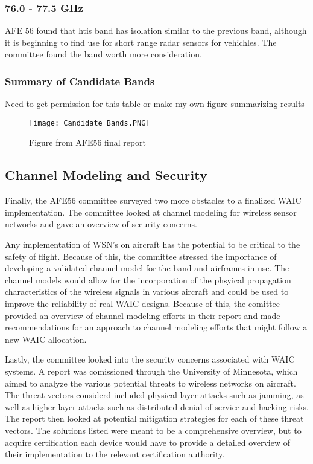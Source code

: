 \subsubsection{76.0 - 77.5 GHz}
 AFE 56 found that htis band has isolation similar to the previous band, although it is beginning to find use for short range radar sensors for vehichles. The committee found the band worth more consideration. 
 
\subsubsection{Summary of Candidate Bands}
 Need to get permission for this table or make my own figure summarizing results
 \begin{figure}
 \centering
 \texttt{[image: Candidate\_Bands.PNG]}
 \caption{Figure from AFE56 final report}
 \label{fig:Candidates}
 \end{figure}
 
\subsection{Channel Modeling and Security}
Finally, the AFE56 committee surveyed two more obstacles to a finalized WAIC implementation. The committee looked at channel modeling for wireless sensor networks and  gave an overview of security concerns. 

Any implementation of WSN's on aircraft has the potential to be critical to the safety of flight. Because of this, the committee stressed the importance of  developing a validated channel model for the band and airframes in use. The channel models would allow for the incorporation of the phsyical propagation characteristics of the wireless signals in various aircraft and could be used to improve the reliability of real WAIC designs. Because of this, the comittee provided an overview of channel modeling efforts in their report and made recommendations for an approach to channel modeling efforts that might follow a new WAIC allocation. 

Lastly, the committee looked into the security concerns associated with WAIC systems. A report was comissioned through the University of Minnesota, which aimed to analyze the various potential threats to wireless networks on aircraft. The threat vectors considerd included physical layer attacks such as jamming, as well as higher layer attacks such as distributed denial of service and hacking risks. The report then looked at potential mitigation strategies for each of these threat vectors. The solutions listed were meant to be a comprehensive overview, but to acquire certification each device would have to provide a detailed overview of their implementation to the relevant certification authority. 

